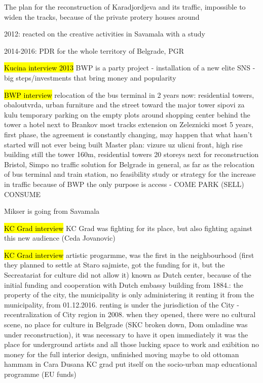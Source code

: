\documentclass[11pt]{report}
\begin{document}
The plan for the reconstruction of Karadjordjeva and its traffic, impossible to widen the tracks, because of the private protery houses around

2012: reacted on the creative activities in Savamala with a study

2014-2016: PDR for the whole territory of Belgrade, PGR  

\hl{Kucina interview 2013}
BWP is a party project - installation of a new elite SNS - big steps/investments that bring money and popularity 

\hl{BWP interview}
relocation of the bus terminal in 2 years
now: residential towers, obaloutvrda, urban furniture and the street toward the major tower
sipovi za kulu
temporary parking on the empty plots around
shopping center behind the tower
a hotel next to Brankov most
tracks extension on Zeleznicki most
5 years, first phase, the agreement is constantly changing, may happen that what hasn't started will not ever being built
Master plan: vizure uz ulicni front, high rise building still
the tower 160m, residential towers 20 storeys
next for reconstruction Bristol, Simpo
no traffic solution for Belgrade in general, as far as the relocation of bus terminal and train station, no feasibility study or strategy for the increase in traffic because of BWP
the only purpose is access - COME PARK (SELL) CONSUME  

Mikser is going from Savamala

\hl{KC Grad interview}
KC Grad was fighting for its place, but also fighting against this new audience (Ceda Jovanovic)

\hl{KC Grad interview}
artistic progarmme, was the first in the neighbourhood (first they planned to settle at Staro sajmiste, got the funding for it, but the Secreatariat for culture did not allow it)
known as Dutch center, because of the initial funding and cooperation with Dutch embassy
building from 1884.: the property of the city, the municipality is only administering it
renting it from the municipality, from 01.12.2016. renting is under the jurisdiction of the City - recentralization of City region
in 2008. when they opened, there were no cultural scene, no place for culture in Belgrade (SKC broken down, Dom omladine was under reconstruction), it was necessary to have it open immediately
it was the place for underground artists and all those lucking space to work and exibition
no money for the full interior design, unfinished
moving maybe to old ottoman hammam in Cara Dusana
KC grad put itself on the socio-urban map
educational programme (EU funds)
\end{document}
